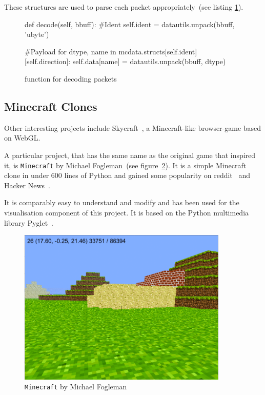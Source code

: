 These structures are used to parse each packet appropriately~(see listing \ref{snippet_parse}).

		\begin{figure}[ht]
			\centering
			\begin{minipage}{13cm}
				\begin{pseudocode}
	def decode(self, bbuff):
		#Ident
		self.ident = datautils.unpack(bbuff, 'ubyte')
		
		#Payload
		for dtype, name in mcdata.structs[self.ident][self.direction]:
			self.data[name] = datautils.unpack(bbuff, dtype)
					\end{pseudocode}
				\caption{function for decoding packets}
				\label{snippet_parse}
			\end{minipage}
		\end{figure}
		
		\subsection{Minecraft Clones}
Other interesting projects include Skycraft~\cite{skycraft}, a Minecraft-like browser-game based on WebGL.

A particular project, that has the same name as the original game that inspired it, is \texttt{Minecraft} by Michael Fogleman~(see figure~\ref{fogleman_mc_screen}). It is a simple Minecraft clone in under 600 lines of Python and gained some popularity on reddit~\cite{fogle-reddit} and Hacker News~\cite{fogle_hn}.

It is comparably easy to understand and modify and has been used for the visualisation component of this project. It is based on the Python multimedia library Pyglet~\cite{pyglet}.

\begin{figure}[h]
  \centering
    \includegraphics[width=10cm]{graphics/fogleman_mc_screen}
  \caption{\texttt{Minecraft} by Michael Fogleman}
  \label{fogleman_mc_screen}
\end{figure}

